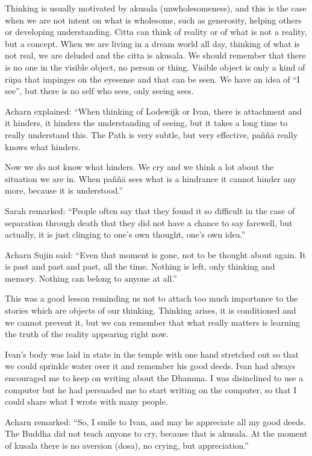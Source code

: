 Thinking is usually motivated by akusala (unwholesomeness), and this is
the case when we are not intent on what is wholesome, such as
generosity, helping others or developing understanding. Citta can think
of reality or of what is not a reality, but a concept. When we are
living in a dream world all day, thinking of what is not real, we are
deluded and the citta is akusala. We should remember that there is no
one in the visible object, no person or thing. Visible object is only a
kind of rūpa that impinges on the eyesense and that can be seen. We have
an idea of ``I see'', but there is no self who sees, only seeing sees.

Acharn explained: ``When thinking of Lodewijk or Ivan, there is
attachment and it hinders, it hinders the understanding of seeing, but
it takes a long time to really understand this. The Path is very subtle,
but very effective, paññā really knows what hinders.

Now we do not know what hinders. We cry and we think a lot about the
situation we are in. When paññā sees what is a hindrance it cannot
hinder any more, because it is understood.''

Sarah remarked: ``People often say that they found it so difficult in
the case of separation through death that they did not have a chance to
say farewell, but actually, it is just clinging to one's own thought,
one's own idea.''

Acharn Sujin said: ``Even that moment is gone, not to be thought about
again. It is past and past and past, all the time. Nothing is left, only
thinking and memory. Nothing can belong to anyone at all.''

This was a good lesson reminding us not to attach too much importance to
the stories which are objects of our thinking. Thinking arises, it is
conditioned and we cannot prevent it, but we can remember that what
really matters is learning the truth of the reality appearing right now.

Ivan's body was laid in state in the temple with one hand stretched out
so that we could sprinkle water over it and remember his good deeds.
Ivan had always encouraged me to keep on writing about the Dhamma. I was
disinclined to use a computer but he had persuaded me to start writing
on the computer, so that I could share what I wrote with many people.

Acharn remarked: ``So, I smile to Ivan, and may he appreciate all my
good deeds. The Buddha did not teach anyone to cry, because that is
akusala. At the moment of kusala there is no aversion (dosa), no crying,
but appreciation.''


